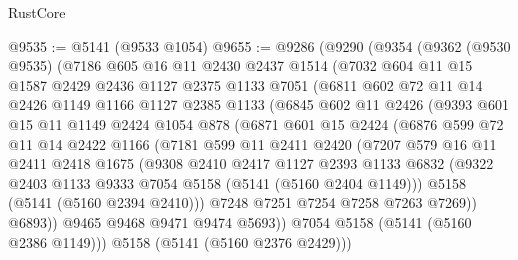 \begin{lexlean}{RustCore}
\begin{coremodule}
@9535 := @5141 (@9533 @1054)
@9655 := @9286
    (@9290
      (@9354
        (@9362
          (@9530 @9535)
          (@7186
            @605
            @16
            @11
            @2430
            @2437
            @1514
            (@7032
              @604
              @11
              @15
              @1587
              @2429
              @2436
              @1127
              @2375
              @1133
              @7051
              (@6811
                @602
                @72
                @11
                @14
                @2426
                @1149
                @1166
                @1127
                @2385
                @1133
                (@6845
                  @602
                  @11
                  @2426
                  (@9393
                    @601
                    @15
                    @11
                    @1149
                    @2424
                    @1054
                    @878
                    (@6871
                      @601
                      @15
                      @2424
                      (@6876
                        @599
                        @72
                        @11
                        @14
                        @2422
                        @1166
                        (@7181
                          @599
                          @11
                          @2411
                          @2420
                          (@7207
                            @579
                            @16
                            @11
                            @2411
                            @2418
                            @1675
                            (@9308
                              @2410
                              @2417
                              @1127
                              @2393
                              @1133
                              @6832
                              (@9322 @2403 @1133 @9333 @7054 @5158 (@5141 (@5160 @2404 @1149)))
                              @5158
                              (@5141 (@5160 @2394 @2410)))
                            @7248
                            @7251
                            @7254
                            @7258
                            @7263
                            @7269))
                        @6893))
                    @9465
                    @9468
                    @9471
                    @9474
                    @5693))
                @7054
                @5158
                (@5141 (@5160 @2386 @1149)))
              @5158
              (@5141 (@5160 @2376 @2429)))

\end{coremodule}
\end{lexlean}
